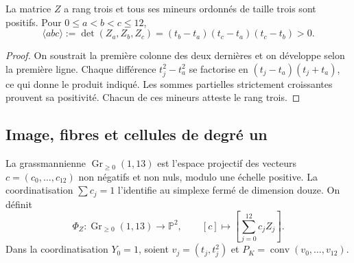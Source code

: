 \begin{proposition}
\label{prop:polygon-vandermonde}
La matrice \(Z\) a rang trois et tous ses mineurs ordonnés de taille
trois sont positifs. Pour \(0\leq a<b<c\leq12\),
\begin{equation}
 \langle abc\rangle:=\det(Z_a,Z_b,Z_c)
 =(t_b-t_a)(t_c-t_a)(t_c-t_b)>0.
 \label{eq:polygon-minors}
\end{equation}
\end{proposition}
\begin{proof}
On soustrait la première colonne des deux dernières et on développe selon la
première ligne. Chaque différence \(t_j^2-t_a^2\) se factorise en
\((t_j-t_a)(t_j+t_a)\), ce qui donne le produit indiqué. Les sommes partielles
strictement croissantes prouvent sa positivité. Chacun de ces
mineurs atteste le rang trois.
\end{proof}

\subsection{Image, fibres et cellules de degré un}

La grassmannienne \(\operatorname{Gr}_{\geq0}(1,13)\) est l'espace projectif des vecteurs \(c=(c_0,\ldots,c_{12})\) non négatifs et non nuls, modulo une échelle positive. La coordinatisation \(\sum c_j=1\) l'identifie au simplexe fermé de dimension douze. On définit
\begin{equation}
 \Phi_Z:\operatorname{Gr}_{\geq0}(1,13)\longrightarrow\mathbb P^2,
 \qquad[c]\longmapsto\left[\sum_{j=0}^{12}c_jZ_j\right].
 \label{eq:polygon-map}
\end{equation}
Dans la coordinatisation \(Y_0=1\), soient \(v_j=(t_j,t_j^2)\) et \(P_K=\operatorname{conv}(v_0,\ldots,v_{12})\).

